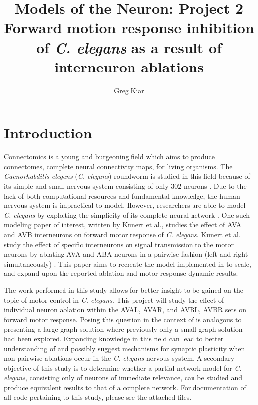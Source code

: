 \documentclass[11pt]{article} %
\title{Models of the Neuron: Project 2 \\ Forward motion response inhibition of \emph{C. elegans} as a result of interneuron ablations}
\author{Greg Kiar}
\begin{document}
\maketitle

\section{Introduction}

Connectomics is a young and burgeoning field which aims to produce connectomes, complete neural connectivity maps, for living organisms. The \emph{Caenorhabditis elegans} (\emph{C. elegans}) roundworm is studied in this field because of its simple and small nervous system consisting of only $302$ neurons \cite{Sulston1977,White1986,Dunn2003, Chen2006}. Due to the lack of both computational resources and fundamental knowledge, the human nervous system is impractical to model. However, researchers are able to model \emph{C. elegans} by exploiting the simplicity of its complete neural network \cite{Iwasaki2006, Iwasaki2004, Dunn2003, Wicks1996a}. One such modeling paper of interest, written by Kunert et al.\cite{Kunert2014}, studies the effect of AVA and AVB interneurons on forward motor response of \emph{C. elegans}. Kunert et al. study the effect of specific interneurons on signal transmission to the motor neurons by ablating AVA and ABA neurons in a pairwise fashion (left and right simultaneously) \cite{Kunert2014}. This paper aims to recreate the model implemented in \cite{Kunert2014} to scale, and expand upon the reported ablation and motor response dynamic results.

The work performed in this study allows for better insight to be gained on the topic of motor control in \emph{C. elegans}. This project will study the effect of individual neuron ablation within the AVAL, AVAR, and AVBL, AVBR sets on forward motor response. Posing this question in the context of \cite{Kunert2014} is analogous to presenting a large graph solution where previously only a small graph solution had been explored. Expanding knowledge in this field can lead to better understanding of and possibly suggest mechanisms for synaptic plasticity when non-pairwise ablations occur in the \emph{C. elegans} nervous system. A secondary objective of this study is to determine whether a partial network model for \emph{C. elegans}, consisting only of neurons of immediate relevance, can be studied and produce equivalent results to that of a complete network. For documentation of all code pertaining to this study, please see the attached files.
\end{document}

